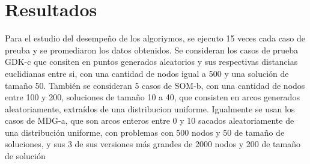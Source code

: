 \documentclass{ci5652}
\begin{document}
%
%

\section{Resultados}
Para el estudio del desempeño de los algoriymos, se ejecuto 15 veces cada caso de preuba y se promediaron
los datos obtenidos. Se consideran los casos de prueba GDK-c que consiten en puntos generados aleatorios y
sus respectivas distancias euclidianas entre si, con una cantidad de nodos igual a 500 y una solución de tamaño 50.
También se consideran 5 casos de SOM-b, con una cantidad de nodos entre 100 y 200, soluciones de tamaño 10 a 40, que consisten
en arcos generados aleatoriamente, extraídos de una distribucion uniforme. Igualmente se usan los casos de MDG-a, que
son arcos enteros entre 0 y 10 sacados aleatoriamente de una distribución uniforme, con problemas con 500 nodos y 50 de tamaño de soluciones, y sus 3 de sus versiones más grandes de 2000 nodos y 200 de tamaño de solución
\end{document}
